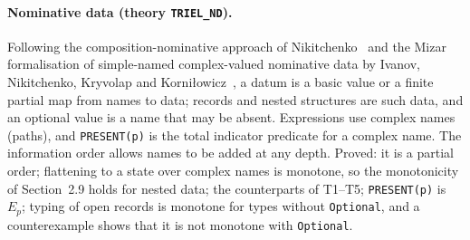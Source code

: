 \documentclass[11pt,a4paper]{article}
\begin{document}
\paragraph{Nominative data (theory \texttt{TRIEL\_ND}).}
Following the composition-nominative approach of Nikitchenko~\cite{Nikitchenko2022} and the
Mizar formalisation of simple-named complex-valued nominative data by Ivanov, Nikitchenko,
Kryvolap and Korni{\l}owicz~\cite{IvanovNikitchenkoKryvolapKornilowicz2017}, a datum is a basic value or a finite partial
map from names to data; records and nested structures are such data, and an optional
value is a name that may be absent. Expressions use complex names (paths), and
\texttt{PRESENT(p)} is the total indicator predicate for a complex name. The information
order allows names to be added at any depth. Proved: it is a partial order; flattening to a
state over complex names is monotone, so the monotonicity of Section~2.9 holds for nested
data; the counterparts of T1--T5; \texttt{PRESENT(p)} is $E_p$; typing of open records is
monotone for types without \texttt{Optional}, and a counterexample shows that it is not
monotone with \texttt{Optional}.
\end{document}
